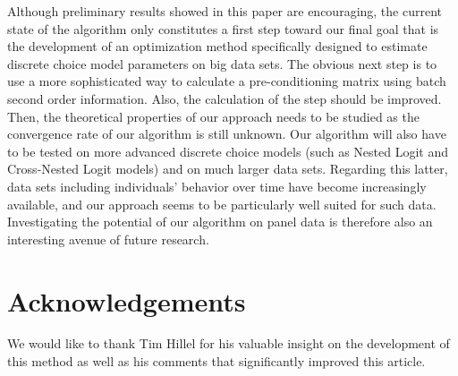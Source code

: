 \documentclass[conference]{IEEEtran}
\begin{document}
Although preliminary results showed in this paper are encouraging, the current state of the algorithm only constitutes a first step toward our final goal that is the development of an optimization method specifically designed to estimate discrete choice model parameters on big data sets. The obvious next step is to use a more sophisticated way to calculate a pre-conditioning matrix using batch second order information. Also, the calculation of the step should be improved. Then, the theoretical properties of our approach needs to be studied as the convergence rate of our algorithm is still unknown. Our algorithm will also have to be tested on more advanced discrete choice models (such as Nested Logit and Cross-Nested Logit models) and on much larger data sets. Regarding this latter, data sets including individuals' behavior over time have become increasingly available, and our approach seems to be particularly well suited for such data. Investigating the potential of our algorithm on panel data is therefore also an interesting avenue of future research. 

\section{Acknowledgements} 
\label{sec:acknowledgements}

We would like to thank Tim Hillel for his valuable insight on the development of this method as well as his comments that significantly improved this article.


\end{document}
